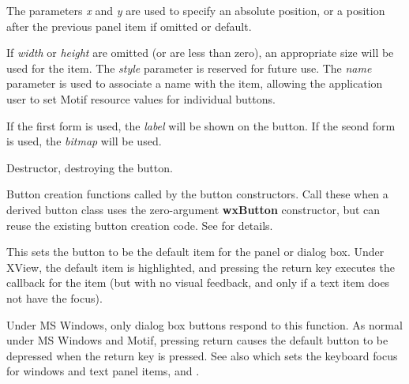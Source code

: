 The parameters {\it x} and {\it y} are used to specify an absolute
position, or a position after the previous panel item if omitted or
default.

If {\it width} or {\it height} are omitted (or are less than zero), an
appropriate size will be used for the item.  The {\it style} parameter
is reserved for future use. The {\it name} parameter is used to associate
a name with the item, allowing the application user to set Motif resource values
for individual buttons.

If the first form is used, the {\it label} will be shown on the button.
If the seond form is used, the {\it bitmap} will be used.



Destructor, destroying the button.




Button creation functions called by the button constructors. Call these
when a derived button class uses the zero-argument {\bf wxButton}
constructor, but can reuse the existing button creation code.
See  for details.

\label{wxbuttonsetdefault}


This sets the button to be the default item for the panel or dialog
box.  Under XView, the default item is highlighted, and pressing the
return key executes the callback for the item (but with no visual
feedback, and only if a text item does not have the focus).

Under MS Windows, only dialog box buttons respond to this function.  As
normal under MS Windows and Motif, pressing return causes the default button to
be depressed when the return key is pressed. See also \rtfsp
which sets the keyboard focus for windows and text panel items, \rtfsp
and .


